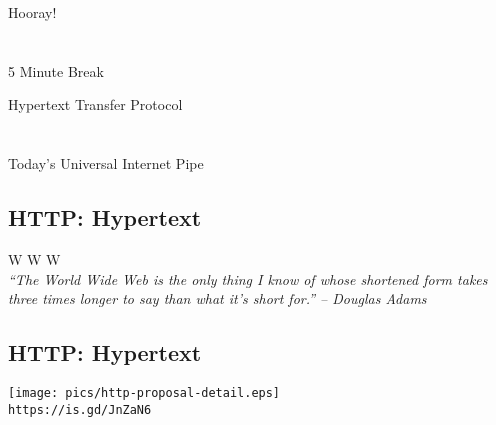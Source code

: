 \documentclass[xga]{xdvislides}
\begin{document}
\newpage
\vspace*{\fill}
\begin{center}
    \Hugesize
        Hooray! \\ [1em]
    \hspace*{5mm}
    \blueline\\
    \hspace*{5mm}\\
        5 Minute Break
\end{center}
\vspace*{\fill}

\newpage
\vspace*{\fill}
\begin{center}
	\Hugesize
		Hypertext Transfer Protocol\\ [1em]
	\hspace*{5mm}
	\blueline\\
	\hspace*{5mm}\\
		Today's Universal Internet Pipe
\end{center}
\vspace*{\fill}

%
%
%

\subsection{HTTP: Hypertext}
\vspace{.5in}
\begin{center}
	\Huge
	W W W
	\\
\vspace{.5in}
	{\em ``The World Wide Web is the only thing I know of whose shortened form
	takes three times longer to say than what it's short for.'' -- Douglas Adams}
\end{center}
\Normalsize


\subsection{HTTP: Hypertext}
\begin{center}
	\texttt{[image: pics/http-proposal-detail.eps]} \\
	\vspace{.5in}
	\verb+https://is.gd/JnZaN6+
\end{center}
\end{document}
